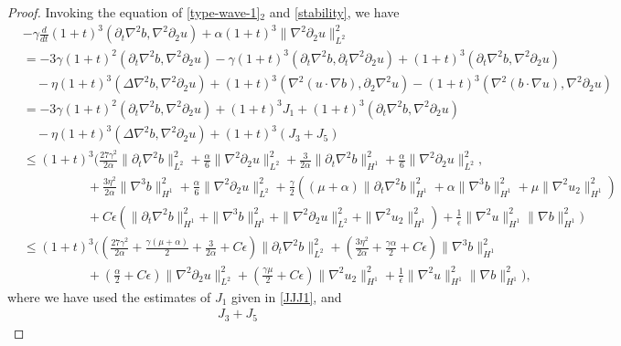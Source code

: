 \documentclass[reqno,11pt]{amsart}
\numberwithin{Thm}{section}
\begin{document}
 \begin{proof}
 Invoking the equation of  \eqref{type-wave-1}$_2$ and \eqref{stability}, we have
 \begin{align*}\label{}
&-\gamma\frac{d}{dt}(1+t)^3(\partial_t\nabla^2b,\nabla^2\partial_2u)+\alpha(1+t)^3\|\nabla^2\partial_2u\|_{L^2}^2\nonumber\\
&=-3\gamma(1+t)^2(\partial_t\nabla^2b,\nabla^2\partial_2u)-\gamma(1+t)^3(\partial_t\nabla^2b,\partial_t\nabla^2\partial_2u)+(1+t)^3(\partial_t\nabla^2b,\nabla^2\partial_2u)\nonumber\\
&\quad-\eta(1+t)^3(\Delta\nabla^2 b,\nabla^2\partial_2u)+(1+t)^3(\nabla^2(u\cdot\nabla b),\partial_2\nabla^2u)-(1+t)^3(\nabla^2(b\cdot\nabla u),\nabla^2\partial_2u)
\nonumber\\
&=-3\gamma(1+t)^2(\partial_t\nabla^2b,\nabla^2\partial_2u)+(1+t)^3J_1+(1+t)^3(\partial_t\nabla^2b,\nabla^2\partial_2u)\nonumber\\
&\quad-\eta(1+t)^3(\Delta\nabla^2 b,\nabla^2\partial_2u)+(1+t)^3(J_3+J_5)
\nonumber\\
& \leq(1+t)^3\Big(\frac{27\gamma^2}{2\alpha}\|\partial_t \nabla^2 b\|_{L^2}^2+\frac{\alpha}{6}\|\nabla^2 \partial_2u\|_{L^2}^2+\frac{3}{2\alpha}\|\partial_t\nabla^2b\|_{H^1}^2+\frac{\alpha}{6}\|\nabla^2\partial_2u\|_{L^2}^2,\\
&\quad\qquad\qquad+ \frac{3\eta^2}{2\alpha}\|\nabla^3 b\|_{H^1}^2+\frac{\alpha}{6}\|\nabla^2\partial_2u\|_{L^2}^2+\frac{\gamma}{2}\left((\mu+\alpha) \|\partial_t\nabla^2b\|_{H^1}^2+\alpha \|\nabla^3 b\|_{H^1}^2+\mu \|\nabla^2u_2\|_{H^1}^2\right)\nonumber\\
&\quad\qquad\qquad+C\epsilon\left(\|\partial_t\nabla^2 b\|_{H^{1}}^2+\|\nabla^3 b\|_{H^{1}}^2+\|\nabla^2\partial_2 u\|_{L^{2}}^2+\|\nabla^2u_2\|_{H^{1}}^2\right)+\frac{1}{\epsilon}\|\nabla^2 u\|_{H^{1}}^2\|\nabla b\|_{H^{1}}^2\Big)\nonumber\\
& \leq(1+t)^3\Big((\frac{27\gamma^2}{2\alpha}+\frac{\gamma(\mu+\alpha)}{2}+\frac{3}{2\alpha}+C\epsilon)\|\partial_t \nabla^2 b\|_{L^2}^2+ (\frac{3\eta^2}{2\alpha}+\frac{\gamma\alpha}{2}+C\epsilon)\|\nabla^3 b\|_{H^1}^2\\
&\quad\qquad\qquad+(\frac{\alpha}{2}+C\epsilon)\|\nabla^2\partial_2 u\|_{L^2}^2+(\frac{\gamma\mu}{2}+C\epsilon)\|\nabla^2u_2\|_{H^1}^2+\frac{1}{\epsilon}\|\nabla^2 u\|_{H^{1}}^2\|\nabla b\|_{H^{1}}^2\Big),
\end{align*}
where we have used the estimates of  $J_1$  given in \eqref{JJJ1}, and
\begin{align*}
J_{3}+J_{5}

\end{align*}
\end{proof}
\end{document}
